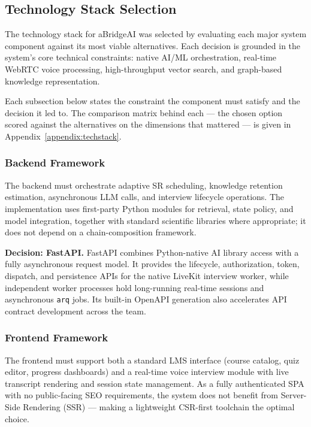 \subsection{Technology Stack Selection}
\label{sec:tech_stack}

The technology stack for aBridgeAI was selected by evaluating each major system component against its most viable alternatives. Each decision is grounded in the system's core technical constraints: native AI/ML orchestration, real-time WebRTC voice processing, high-throughput vector search, and graph-based knowledge representation.

Each subsection below states the constraint the component must satisfy and the decision it led to. The comparison matrix behind each --- the chosen option scored against the alternatives on the dimensions that mattered --- is given in Appendix~\ref{appendix:techstack}.

\subsubsection{Backend Framework}

The backend must orchestrate adaptive SR scheduling, knowledge retention estimation, asynchronous LLM calls, and interview lifecycle operations. The implementation uses first-party Python modules for retrieval, state policy, and model integration, together with standard scientific libraries where appropriate; it does not depend on a chain-composition framework.


\textbf{Decision: FastAPI.} FastAPI combines Python-native AI library access with a fully asynchronous request model. It provides the lifecycle, authorization, token, dispatch, and persistence APIs for the native LiveKit interview worker, while independent worker processes hold long-running real-time sessions and asynchronous \texttt{arq} jobs. Its built-in OpenAPI generation also accelerates API contract development across the team.

\subsubsection{Frontend Framework}

The frontend must support both a standard LMS interface (course catalog, quiz editor, progress dashboards) and a real-time voice interview module with live transcript rendering and session state management. As a fully authenticated SPA with no public-facing SEO requirements, the system does not benefit from Server-Side Rendering (SSR) — making a lightweight CSR-first toolchain the optimal choice.


